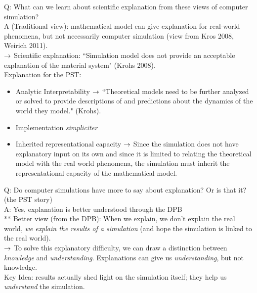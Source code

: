Q: What can we learn about scientific explanation from these views of computer simulation? \\

A (Traditional view): mathematical model can give explanation for real-world phenomena, but not necessarily computer simulation (view from Kros 2008, Weirich 2011). \\

$\rightarrow$ Scientific explanation: ``Simulation model does not provide an acceptable explanation of the material system" (Krohs 2008). \\

Explanation for the PST:
\begin{itemize}
	\item Analytic Interpretability
	$\rightarrow$ ``Theoretical models need to be further analyzed or solved to provide descriptions of and predictions about the dynamics of the world they model." (Krohs).
	\item Implementation {\it simpliciter}
	\item Inherited representational capacity
	$\rightarrow$ Since the simulation does not have explanatory input on its own and since it is limited to relating the theoretical model with the real world phenomena, the simulation must inherit the representational capacity of the mathematical model.
\end{itemize}

Q: Do computer simulations have more to say about explanation? Or is that it? (the PST story) \\

A: Yes, explanation is better understood through the DPB \\

** Better view (from the DPB): When we explain, we don't explain the real world, {\it we explain the results of a simulation} (and hope the simulation is linked to the real world). \\

$\rightarrow$ To solve this explanatory difficulty, we can draw a distinction between {\it knowledge} and {\it understanding}. Explanations can give us {\it understanding}, but not knowledge. \\

Key Idea: results actually shed light on the simulation itself; they help us {\it understand} the simulation. \\


